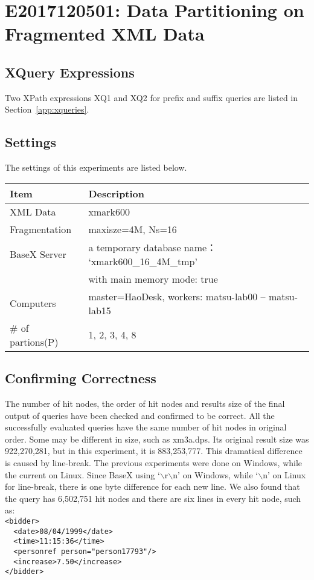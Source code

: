 

\section{E2017120501: Data Partitioning on Fragmented XML Data}

\subsection{XQuery Expressions}

Two XPath expressions XQ1 and XQ2 for prefix and suffix queries 
are listed in Section~\ref{app:xqueries}.


\subsection{Settings}

The settings of this experiments are listed below.

\begin{tabular}{l|l}
    \hline
    \textbf{Item} & \textbf{Description }\\
    \hline
    XML Data & xmark600 \\
    \hline
    Fragmentation & maxisze=4M, Ns=16\\
    \hline
	BaseX Server & a temporary database name： `xmark600\_16\_4M\_tmp'\\
	& with main memory mode: true\\ 
	\hline
	Computers&  master=HaoDesk, workers: matsu-lab00 -- matsu-lab15\\
	\hline
	\# of partions(P) &  1, 2, 3, 4, 8\\
    \hline
\end{tabular}	


\subsection{Confirming Correctness}

The number of hit nodes, the order of hit nodes and results size of
the final output of queries have been checked and confirmed to be correct. 
All the successfully evaluated queries 
have the same number of hit nodes in original order. Some may be 
different in size, such as xm3a.dps. Its original result size
was 922,270,281, but in this experiment, it is 883,253,777.
This dramatical difference is caused by line-break. The previous 
experiments were done on Windows, while the current on Linux. 
Since BaseX using `$\backslash$r$\backslash$n' on Windows, while
 `$\backslash$n' on Linux for line-break, there is one byte 
difference for each new line. We also found that the query has 
6,502,751 hit nodes and  there are six lines in every hit node, 
such as:\\
\verb|<bidder>|\\
\verb|  <date>08/04/1999</date>|\\
\verb|  <time>11:15:36</time>|\\
\verb|  <personref person="person17793"/>|\\
\verb|  <increase>7.50</increase>|\\
\verb|</bidder>|\\

